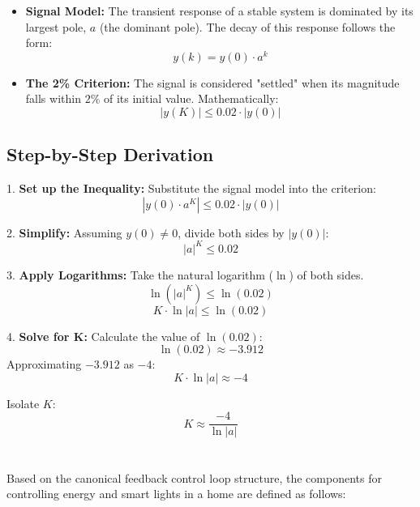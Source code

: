 \documentclass[a4paper,12pt]{article}
\begin{document}
\begin{itemize}
    \item \textbf{Signal Model:} The transient response of a stable system is dominated by its largest pole, $a$ (the dominant pole). The decay of this response follows the form:
    $$ y(k) = y(0) \cdot a^k $$
    \item \textbf{The 2\% Criterion:} The signal is considered "settled" when its magnitude falls within $2\%$ of its initial value. Mathematically:
    $$ |y(K)| \le 0.02 \cdot |y(0)| $$
\end{itemize}

\subsection{Step-by-Step Derivation}

1.  \textbf{Set up the Inequality:}
    Substitute the signal model into the criterion:
    $$ |y(0) \cdot a^K| \le 0.02 \cdot |y(0)| $$

2.  \textbf{Simplify:}
    Assuming $y(0) \ne 0$, divide both sides by $|y(0)|$:
    $$ |a|^K \le 0.02 $$

3.  \textbf{Apply Logarithms:}
    Take the natural logarithm ($\ln$) of both sides.
    $$ \ln(|a|^K) \le \ln(0.02) $$
    $$ K \cdot \ln|a| \le \ln(0.02) $$

4.  \textbf{Solve for K:}
    Calculate the value of $\ln(0.02)$:
    $$ \ln(0.02) \approx -3.912 $$
    Approximating $-3.912$ as $-4$:
    $$ K \cdot \ln|a| \approx -4 $$
    
    Isolate $K$:
    $$ K \approx \frac{-4}{\ln|a|} $$


\section{}

Based on the canonical feedback control loop structure, the components for controlling energy and smart lights in a home are defined as follows:
\end{document}
